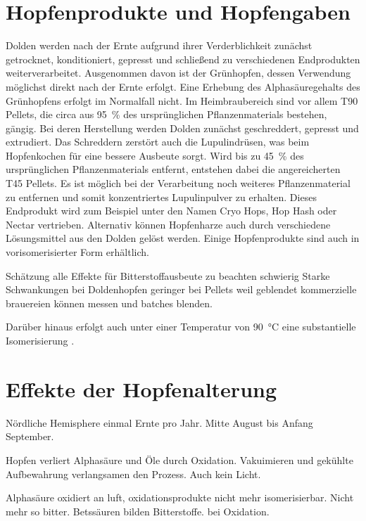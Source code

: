 \documentclass[a4paper,parskip=half]{scrartcl}
\begin{document}
\section*{Hopfenprodukte und Hopfengaben}

Dolden werden nach der Ernte aufgrund ihrer Verderblichkeit zunächst getrocknet, konditioniert, gepresst und schließend zu verschiedenen Endprodukten weiterverarbeitet. Ausgenommen davon ist der Grünhopfen, dessen Verwendung möglichst direkt nach der Ernte erfolgt. Eine Erhebung des Alphasäuregehalts des Grünhopfens erfolgt im Normalfall nicht. Im Heimbraubereich sind vor allem T90 Pellets, die circa aus 95~\% des ursprünglichen Pflanzenmaterials bestehen, gängig. Bei deren Herstellung werden Dolden zunächst geschreddert, gepresst und extrudiert. Das Schreddern zerstört auch die Lupulindrüsen, was beim Hopfenkochen für eine bessere Ausbeute sorgt. Wird bis zu 45~\% des ursprünglichen Pflanzenmaterials entfernt, entstehen dabei die angereicherten T45 Pellets. Es ist möglich bei der Verarbeitung noch weiteres Pflanzenmaterial zu entfernen und somit konzentriertes Lupulinpulver zu erhalten. Dieses Endprodukt wird zum Beispiel unter den Namen Cryo Hops, Hop Hash oder Nectar vertrieben. Alternativ können Hopfenharze auch durch verschiedene Lösungsmittel aus den Dolden gelöst werden. Einige Hopfenprodukte sind auch in vorisomerisierter Form erhältlich.
\parencites[166-172]{Nottebohm2020}[80-90]{Garetz1994}


\parencite[58]{Hall1997}
Schätzung alle Effekte für Bitterstoffausbeute zu beachten schwierig
Starke Schwankungen bei Doldenhopfen
geringer bei Pellets weil geblendet
kommerzielle brauereien können messen und batches blenden.


 Darüber hinaus erfolgt auch unter einer Temperatur von 90~°C eine substantielle Isomerisierung \parencite[29]{Malowicki2005}.

\section*{Effekte der Hopfenalterung}

Nördliche Hemisphere einmal Ernte pro Jahr. Mitte August bis
Anfang September.
\parencite[97]{Garetz1994}

\parencite[97]{Garetz1994} Hopfen verliert Alphasäure und Öle
durch Oxidation. Vakuimieren und gekühlte Aufbewahrung verlangsamen
den Prozess. Auch kein Licht. 

\parencite[103]{Garetz1994} Alphasäure oxidiert an luft, oxidationsprodukte
nicht mehr isomerisierbar. Nicht mehr so bitter. Betssäuren bilden
Bitterstoffe. bei Oxidation.
\end{document}
